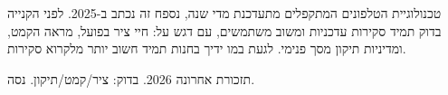 טכנולוגיית הטלפונים המתקפלים מתעדכנת מדי שנה, נספח זה נכתב ב-2025. לפני הקנייה בדוק תמיד סקירות עדכניות ומשוב משתמשים, עם דגש על: חיי ציר בפועל, מראה הקמט, ומדיניות תיקון מסך פנימי. לגעת במו ידיך בחנות תמיד חשוב יותר מלקרוא סקירות.

\begin{tcbinfo}{תזכורת אחרונה}
2026. בדוק: ציר/קמט/תיקון. נסה.

\end{tcbinfo}
